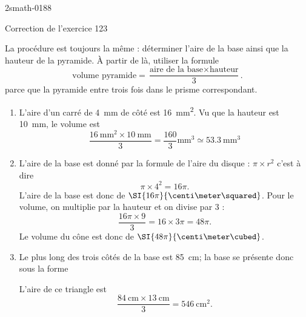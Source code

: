 
\begin{corrige}{2smath-0188}

\begin{center}
    Correction de l'exercice 123
\end{center}

La procédure est toujours la même : déterminer l'aire de la base ainsi que la hauteur de la pyramide. À partir de là, utiliser la formule
\begin{equation}
    \text{volume pyramide}=\frac{ \text{aire de la base}\times \text{hauteur} }{ 3 }.
\end{equation}
parce que la pyramide entre trois fois dans le prisme correspondant.
\begin{enumerate}
    \item
        L'aire d'un carré de \SI{4}{\milli\meter} de côté est \SI{16}{\milli\meter\squared}. Vu que la hauteur est \SI{10}{\milli\meter}, le volume est
        \begin{equation}
            \frac{ \SI{16}{\milli\meter\squared}\times \SI{10}{\milli\meter} }{ 3 }=\frac{ 160 }{ 3 }\si{\milli\meter\cubed}\simeq \SI{53.3}{\milli\meter\cubed}
        \end{equation}
    \item
        L'aire de la base est donné par la formule de l'aire du disque : \( \pi\times r^2\) c'est à dire
        \begin{equation}
            \pi\times 4^2=16\pi.
        \end{equation}
        L'aire de la base est donc de \( \SI{16\pi}{\centi\meter\squared}\). Pour le volume, on multiplie par la hauteur et on divise par \( 3\) :
        \begin{equation}
            \frac{ 16\pi\times 9 }{ 3 }=16\times 3\pi=48\pi.
        \end{equation}
        Le volume du cône est donc de \( \SI{48\pi}{\centi\meter\cubed}\).
    \item
        Le plus long des trois côtés de la base est \SI{85}{\centi\meter}; la base se présente donc sous la forme
        \begin{center}
            
        \end{center}
        L'aire de ce triangle est 
        \begin{equation}
            \frac{ \SI{84}{\centi\meter}\times \SI{13}{\centi\meter} }{ 3 }=\SI{546}{\centi\meter\squared}.
        \end{equation}


\end{enumerate}
\end{corrige}
